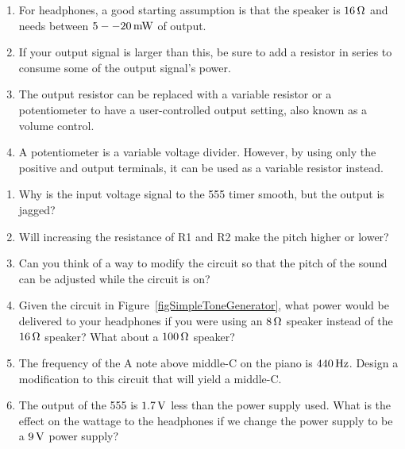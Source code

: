 \begin{enumerate}
\item For headphones, a good starting assumption is that the speaker is $16\,\si{\ohm}$ and needs between $5--20\,\si{\milli\watt}$ of output.
\item If your output signal is larger than this, be sure to add a resistor in series to consume some of the output signal's power.
\item The output resistor can be replaced with a variable resistor or a potentiometer to have a user-controlled output setting, also known as a volume control.
\item A potentiometer is a variable voltage divider.  However, by using only the positive and output terminals, it can be used as a variable resistor instead.
\end{enumerate}

\applysection

\begin{enumerate}
\item Why is the input voltage signal to the 555 timer smooth, but the output is jagged?
\item Will increasing the resistance of R1 and R2 make the pitch higher or lower?
\item Can you think of a way to modify the circuit so that the pitch of the sound can be adjusted while the circuit is on? 
\item Given the circuit in Figure~\ref{figSimpleToneGenerator}, what power would be delivered to your headphones if you were using an $8\,\si{\ohm}$ speaker instead of the $16\,\si{\ohm}$ speaker?  What about a $100\,\si{\ohm}$ speaker?
\item The frequency of the A note above middle-C on the piano is $440\,\si{\hertz}$.  Design a modification to this circuit that will yield a middle-C.
\item The output of the 555 is $1.7\,\si{\volt}$ less than the power supply used.  What is the effect on the wattage to the headphones if we change the power supply to be a $9\,\si{\volt}$ power supply?
\end{enumerate}
